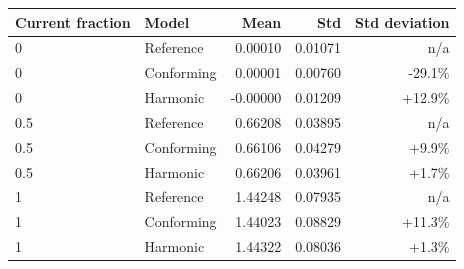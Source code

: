 \begin{tabular}{llrrr}\toprule
Current fraction & Model & Mean & Std & Std deviation\\\midrule
0 & Reference & 0.00010 & 0.01071 & n/a \\
0 & Conforming & 0.00001 & 0.00760 & -29.1\% \\
0 & Harmonic & -0.00000 & 0.01209 & +12.9\% \\
0.5 & Reference & 0.66208 & 0.03895 & n/a \\
0.5 & Conforming & 0.66106 & 0.04279 & +9.9\% \\
0.5 & Harmonic & 0.66206 & 0.03961 & +1.7\% \\
1 & Reference & 1.44248 & 0.07935 & n/a \\
1 & Conforming & 1.44023 & 0.08829 & +11.3\% \\
1 & Harmonic & 1.44322 & 0.08036 & +1.3\% \\
\bottomrule\end{tabular}

